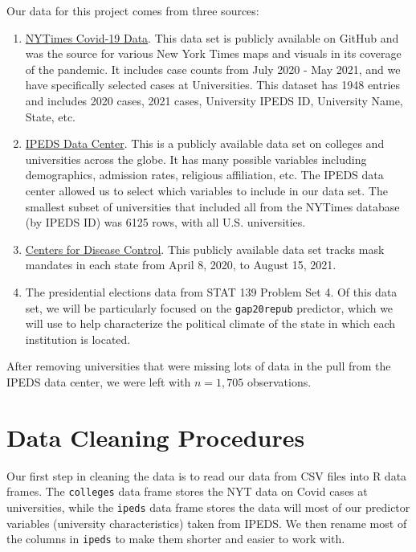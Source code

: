 \documentclass[
]{article}
\begin{document}
Our data for this project comes from three sources:

\begin{enumerate}
\def\labelenumi{\arabic{enumi}.}
\item
  \href{https://github.com/nytimes/covid-19-data/tree/master/colleges}{NYTimes
  Covid-19 Data}. This data set is publicly available on GitHub and was
  the source for various New York Times maps and visuals in its coverage
  of the pandemic. It includes case counts from July 2020 - May 2021,
  and we have specifically selected cases at Universities. This dataset
  has 1948 entries and includes 2020 cases, 2021 cases, University IPEDS
  ID, University Name, State, etc.
\item
  \href{https://nces.ed.gov/ipeds/use-the-data}{IPEDS Data Center}. This
  is a publicly available data set on colleges and universities across
  the globe. It has many possible variables including demographics,
  admission rates, religious affiliation, etc. The IPEDS data center
  allowed us to select which variables to include in our data set. The
  smallest subset of universities that included all from the NYTimes
  database (by IPEDS ID) was 6125 rows, with all U.S. universities.
\item
  \href{https://data.cdc.gov/Policy-Surveillance/U-S-State-and-Territorial-Public-Mask-Mandates-Fro/tzyy-aayg}{Centers
  for Disease Control}. This publicly available data set tracks mask
  mandates in each state from April 8, 2020, to August 15, 2021.
\item
  The presidential elections data from STAT 139 Problem Set 4. Of this
  data set, we will be particularly focused on the \texttt{gap20repub}
  predictor, which we will use to help characterize the political
  climate of the state in which each institution is located.
\end{enumerate}

After removing universities that were missing lots of data in the pull
from the IPEDS data center, we were left with \(n = 1,705\)
observations.

\hypertarget{data-cleaning-procedures}{%
\section{Data Cleaning Procedures}\label{data-cleaning-procedures}}

Our first step in cleaning the data is to read our data from CSV files
into R data frames. The \texttt{colleges} data frame stores the NYT data
on Covid cases at universities, while the \texttt{ipeds} data frame
stores the data will most of our predictor variables (university
characteristics) taken from IPEDS. We then rename most of the columns in
\texttt{ipeds} to make them shorter and easier to work with.
\end{document}
